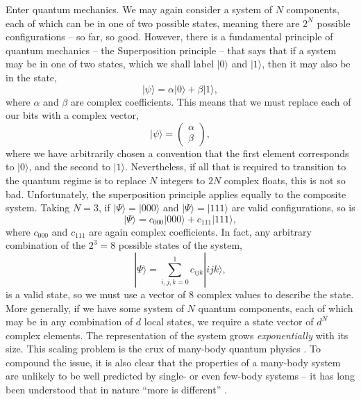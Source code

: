 Enter quantum mechanics. We may again consider a system of \(N\) components, each of which can be in one of two possible states, meaning there are \(2^{N}\) possible configurations -- so far, so good. However, there is a fundamental principle of quantum mechanics -- the Superposition principle -- that says that if a system may be in one of two states, which we shall label \(|0 \rangle\) and \(|1\rangle\), then it may also be in the state,
\begin{equation}
	| \psi \rangle = \alpha |0\rangle + \beta |1\rangle,
	\label{eq:mbq1-1}
\end{equation}
where \(\alpha\) and \(\beta\) are complex coefficients. This means that we must replace each of our bits with a complex vector,
\begin{equation}
	|\psi \rangle = \begin{pmatrix}
						\alpha \\
						\beta
					\end{pmatrix},
	\label{eq:mbq1-2}
\end{equation}
where we have arbitrarily chosen a convention that the first element corresponds to \(|0\rangle\), and the second to \(|1\rangle\). Nevertheless, if all that is required to transition to the quantum regime is to replace \(N\) integers to \(2N\) complex floats, this is not so bad. Unfortunately, the superposition principle applies equally to the composite system. Taking \(N=3\), if \(|\Psi\rangle = |000\rangle\) and \(|\Psi\rangle = |111\rangle\) are valid configurations, so is 
\begin{equation}  
	| \Psi \rangle = c_{000}|000 \rangle + c_{111}| 111 \rangle,
	\label{eq:mbq1-3}
\end{equation}
where \(c_{000}\) and \(c_{111}\) are again complex coefficients. In fact, any arbitrary combination of the \(2^{3} = 8\) possible states of the system,
\begin{equation}
	| \Psi \rangle = \sum^{1}_{i,j,k=0} c_{ijk} |ijk \rangle,
	\label{eq:mbq1-4}
\end{equation}
is a valid state, so we must use a vector of 8 complex values to describe the state. More generally, if we have some system of \(N\) quantum components, each of which may be in any combination of \(d\) local states, we require a state vector of \(d^{N}\) complex elements. The representation of the system grows \emph{exponentially} with its size. This scaling problem is the crux of many-body quantum physics \cite{Barnett_MS,NielsenChuang_CS}. To compound the issue, it is also clear that the properties of a many-body system are unlikely to be well predicted by single- or even few-body systems -- it has long been understood that in nature ``more is different'' \cite{Anderson1972}.

